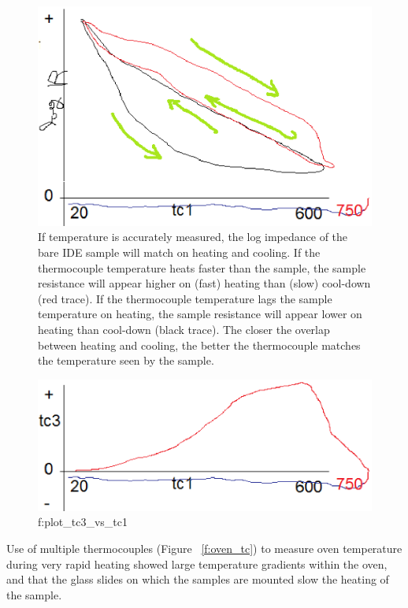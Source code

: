 \documentclass[12pt,oneside,english]{article}
\begin{document}
	\begin{figure}
		\includegraphics[width=150mm]{images/plot_logR_vs_tc1_and_tc3.eps}
		\caption{If temperature is accurately measured, the log impedance of the bare IDE sample will match on heating and cooling.  If the thermocouple temperature heats faster than the sample, the sample resistance will appear higher on (fast) heating than (slow) cool-down (red trace).  If the thermocouple temperature lags the sample temperature on heating, the sample resistance will appear lower on heating than cool-down (black trace).  The closer the overlap between heating and cooling, the better the thermocouple matches the temperature seen by the sample. }
		\label{f:logR_vs_t1_and_t3}
	\end{figure}
	
	\begin{figure}
		\includegraphics[width=150mm]{images/residual_plot_tc3_vs_tc1.eps}
		\caption{f:plot\_tc3\_vs\_tc1}
		\label{f:plot_tc3_vs_tc1}
	\end{figure}
	
	Use of multiple thermocouples (Figure ~\ref{f:oven_tc}) to measure oven temperature during very rapid heating showed large temperature gradients within the oven, and that the glass slides on which the samples are mounted slow the heating of the sample.
\end{document}

